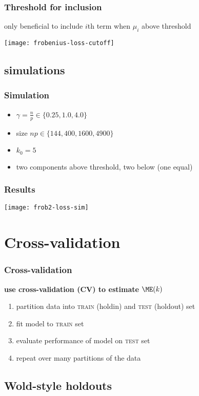 \documentclass[14pt]{beamer}
\begin{document}
\begin{frame}
  \frametitle{Threshold for inclusion}
  only beneficial to include $i$th term when $\mu_i$ above threshold
  \begin{center}
  \texttt{[image: frobenius-loss-cutoff]}
  \end{center}
\end{frame}
\subsection{simulations}

\begin{frame}
  \frametitle{Simulation}
  \begin{itemize}
  \item $\gamma = \frac{n}{p} \in \{ 0.25, 1.0, 4.0 \}$
  \item size $n p \in \{ 144, 400, 1600, 4900 \}$
  \item $k_0 = 5$
  \item two components above threshold, two below (one equal)
  \end{itemize}
\end{frame}

\begin{frame}
  \frametitle{Results}
  \begin{center}
  \texttt{[image: frob2-loss-sim]}
  \end{center}
\end{frame}


\section{Cross-validation}

\begin{frame}
  \frametitle{Cross-validation}
  \textbf{use cross-validation (CV) to estimate $\ME(k)$}
  \begin{enumerate}
  \item partition data into \textsc{train} (holdin) and \textsc{test} (holdout) set
  \item fit model to \textsc{train} set   
  \item evaluate performance of model on \textsc{test} set
  \item repeat over many partitions of the data
  \end{enumerate}
\end{frame}

\subsection{Wold-style holdouts}
\end{document}
